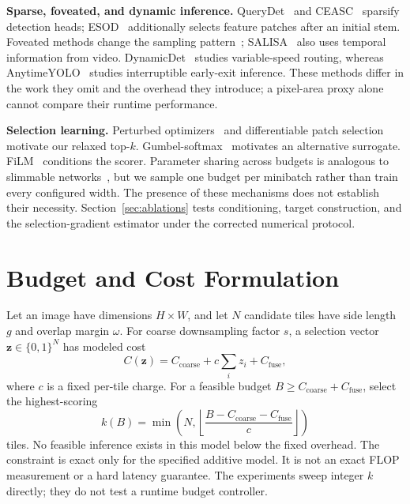 \documentclass[conference]{IEEEtran}
\begin{document}
\textbf{Sparse, foveated, and dynamic inference.} QueryDet~\cite{yang2022querydet} and CEASC~\cite{du2023ceasc} sparsify detection heads; ESOD~\cite{liu2025esod} additionally selects feature patches after an initial stem. Foveated methods change the sampling pattern~\cite{recasens2018zoom,thavamani2021fovea,thavamani2023lzu}; SALISA~\cite{bejnordi2022salisa} also uses temporal information from video. DynamicDet~\cite{lin2023dynamicdet} studies variable-speed routing, whereas AnytimeYOLO~\cite{kuhse2025anytimeyolo} studies interruptible early-exit inference. These methods differ in the work they omit and the overhead they introduce; a pixel-area proxy alone cannot compare their runtime performance.

\textbf{Selection learning.} Perturbed optimizers~\cite{berthet2020perturbed} and differentiable patch selection~\cite{cordonnier2021patch} motivate our relaxed top-$k$. Gumbel-softmax~\cite{jang2017gumbel} motivates an alternative surrogate. FiLM~\cite{perez2018film} conditions the scorer. Parameter sharing across budgets is analogous to slimmable networks~\cite{yu2019slimmable}, but we sample one budget per minibatch rather than train every configured width. The presence of these mechanisms does not establish their necessity. Section~\ref{sec:ablations} tests conditioning, target construction, and the selection-gradient estimator under the corrected numerical protocol.

\section{Budget and Cost Formulation}
\label{sec:cost}
Let an image have dimensions $H\times W$, and let $N$ candidate tiles have side length $g$ and overlap margin $\omega$. For coarse downsampling factor $s$, a selection vector $\mathbf z\in\{0,1\}^N$ has modeled cost
\begin{equation}
C(\mathbf z)=C_{\mathrm{coarse}}+c\sum_i z_i+C_{\mathrm{fuse}},
\end{equation}
where $c$ is a fixed per-tile charge. For a feasible budget $B\ge C_{\mathrm{coarse}}+C_{\mathrm{fuse}}$, select the highest-scoring
\begin{equation}
k(B)=\min\!\left(N,\left\lfloor\frac{B-C_{\mathrm{coarse}}-C_{\mathrm{fuse}}}{c}\right\rfloor\right)
\end{equation}
tiles. No feasible inference exists in this model below the fixed overhead. The constraint is exact only for the specified additive model. It is not an exact FLOP measurement or a hard latency guarantee. The experiments sweep integer $k$ directly; they do not test a runtime budget controller.
\end{document}
